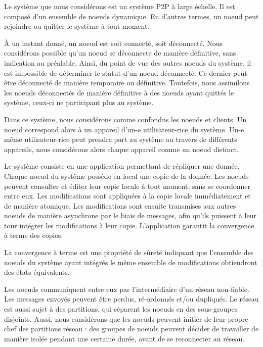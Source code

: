 \label{sec:system-model}

Le système que nous considérons est un système \acf{P2P} à large échelle.
Il est composé d'un ensemble de noeuds dynamique.
En d'autres termes, un noeud peut rejoindre ou quitter le système à tout moment.

À un instant donné, un noeud est soit connecté, soit déconnecté.
Nous considérons possible qu'un noeud se déconnecte de manière définitive, sans indication au préalable.
Ainsi, du point de vue des autres noeuds du système, il est impossible de déterminer le statut d'un noeud déconnecté.
Ce dernier peut être déconnecté de manière temporaire ou définitive.
Toutefois, nous assimilons les noeuds déconnectés de manière définitive à des noeuds ayant quittés le système, ceux-ci ne participant plus au système.

Dans ce système, nous considérons comme confondus les noeuds et clients.
Un noeud correspond alors à un appareil d'un-e utilisateur-rice du système.
Un-e même utilisateur-rice peut prendre part au système au travers de différents appareils, nous considérons alors chaque appareil comme un noeud distinct.

Le système consiste en une application permettant de répliquer une donnée.
Chaque noeud du système possède en local une copie de la donnée.
Les noeuds peuvent consulter et éditer leur copie locale à tout moment, sans se coordonner entre eux.
Les modifications sont appliquées à la copie locale immédiatement et de manière atomique.
Les modifications sont ensuite transmises aux autres noeuds de manière asynchrone par le biais de messages, afin qu'ils puissent à leur tour intégrer les modifications à leur copie.
L'application garantit la convergence à terme des copies.

\begin{definition}
    \label{def:eventual-consistency}
    La convergence à terme est une propriété de sûreté indiquant que l'ensemble des noeuds du système ayant intégrés le même ensemble de modifications obtiendront des états équivalents\footnotemark.
\end{definition}

Les noeuds communiquent entre eux par l'intermédiaire d'un réseau non-fiable.
Les messages envoyés peuvent être perdus, ré-ordonnés et/ou dupliqués.
Le réseau est aussi sujet à des partitions, qui séparent les noeuds en des sous-groupes disjoints.
Aussi, nous considérons que les noeuds peuvent initier de leur propre chef des partitions réseau : des groupes de noeuds peuvent décider de travailler de manière isolée pendant une certaine durée, avant de se reconnecter au réseau.


